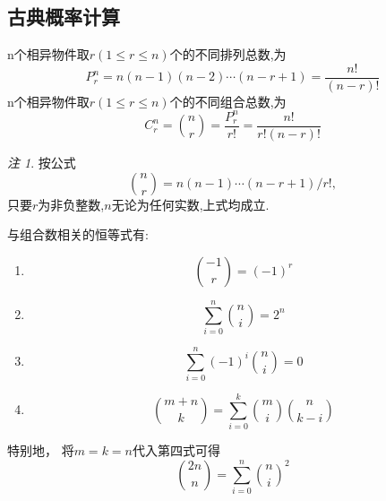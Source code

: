 \documentclass[a4paper,11pt]{article}%
\theoremstyle{remark}
\newtheorem*{remark}{注}
\theoremstyle{remark}
\theoremstyle{definition}
\theoremstyle{definition}
\theoremstyle{plain}
\begin{document}
\subsection{古典概率计算}
n个相异物件取$r(1\leq r\leq n)$个的不同排列总数,为
\[P^n_r=n(n-1)(n-2)\cdots(n-r+1)=\frac{n!}{(n-r)!}\]
n个相异物件取$r(1\leq r\leq n)$个的不同组合总数,为
\[C^n_r=\binom{n}{r}=\frac{P^n_r}{r!}=\frac{n!}{r!(n-r)!}\]
\begin{remark}
    按公式
    \[\binom{n}{r}=n(n-1)\cdots(n-r+1)/r!,\]
    只要$r$为非负整数,$n$无论为任何实数,上式均成立.
\end{remark}
与组合数相关的恒等式有:
\begin{enumerate}
    \item \[\binom{-1}{r}=(-1)^r\]
    \item \[\sum_{i=0}^{n}\binom{n}{i}=2^n\]
    \item \[\sum_{i=0}^{n}(-1)^i\binom{n}{i}=0\]
    \item \[\binom{m+n}{k}=\sum_{i=0}^{k}\binom{m}{i}\binom{n}{k-i}\]
\end{enumerate}
特别地， 将$m=k=n$代入第四式可得
\[\binom{2n}{n}=\sum^n_{i=0}\binom{n}{i}^2\]
\end{document}
